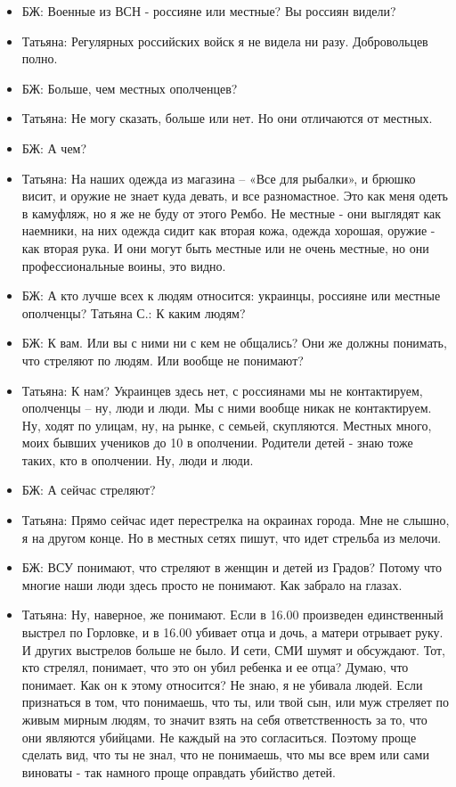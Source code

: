 \begin{itemize}
\item БЖ: Военные из ВСН - россияне или местные? Вы россиян видели?
\item Татьяна: Регулярных российских войск я не видела ни разу. Добровольцев полно.
\item БЖ: Больше, чем местных ополченцев?
\item Татьяна: Не могу сказать, больше или нет. Но они отличаются от местных.
\item БЖ: А чем?
\item Татьяна: На наших одежда из магазина – «Все для рыбалки», и брюшко висит, и оружие не знает куда девать, и все разномастное. Это как меня одеть в камуфляж, но я же не буду от этого Рембо. Не местные - они выглядят как наемники, на них одежда сидит как вторая кожа, одежда хорошая, оружие - как вторая рука. И они могут быть местные или не очень местные, но они профессиональные воины, это видно.
\item БЖ: А кто лучше всех к людям относится: украинцы, россияне или местные ополченцы?
Татьяна С.: К каким людям?
\item БЖ: К вам. Или вы с ними ни с кем не общались? Они же должны понимать, что стреляют по людям. Или вообще не понимают?
\item Татьяна: К нам? Украинцев здесь нет, с россиянами мы не контактируем, ополченцы – ну, люди и люди. Мы с ними вообще никак не контактируем. Ну, ходят по улицам, ну, на рынке, с семьей, скупляются. Местных много, моих бывших учеников до 10 в ополчении. Родители детей - знаю тоже таких, кто в ополчении. Ну, люди и люди.
\item БЖ: А сейчас стреляют?
\item Татьяна: Прямо сейчас идет перестрелка на окраинах города. Мне не слышно, я на другом конце. Но в местных сетях пишут, что идет стрельба из мелочи.
\item БЖ: ВСУ понимают, что стреляют в женщин и детей из Градов? Потому что многие наши люди здесь просто не понимают. Как забрало на глазах.
\item Татьяна: Ну, наверное, же понимают. Если в 16.00 произведен единственный выстрел по Горловке, и в 16.00 убивает отца и дочь, а матери отрывает руку. И других выстрелов больше не было. И сети, СМИ шумят и обсуждают. Тот, кто стрелял, понимает, что это он убил ребенка и ее отца? Думаю, что понимает. Как он к этому относится? Не знаю, я не убивала людей. Если признаться в том, что понимаешь, что ты, или твой сын, или муж стреляет по живым мирным людям, то значит взять на себя ответственность за то, что они являются убийцами. Не каждый на это согласиться. Поэтому проще сделать вид, что ты не знал, что не понимаешь, что мы все врем или сами виноваты - так намного проще оправдать убийство детей.

\end{itemize}
